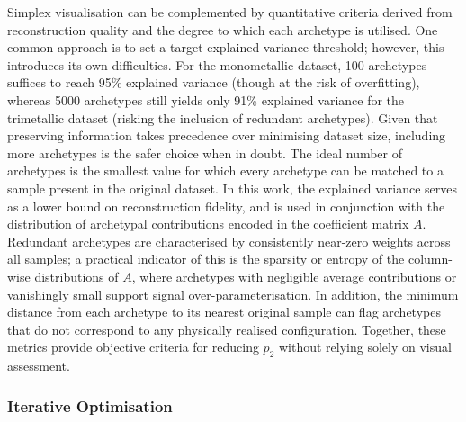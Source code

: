 \documentclass{WileyMSP-template}
\begin{document}
Simplex visualisation can be complemented by quantitative criteria derived from reconstruction quality and the degree to which each archetype is utilised. One common approach is to set a target explained variance threshold; however, this introduces its own difficulties. For the monometallic dataset, 100 archetypes suffices to reach 95\% explained variance (though at the risk of overfitting), whereas 5000 archetypes still yields only 91\% explained variance for the trimetallic dataset (risking the inclusion of redundant archetypes). Given that preserving information takes precedence over minimising dataset size, including more archetypes is the safer choice when in doubt. The ideal number of archetypes is the smallest value for which every archetype can be matched to a sample present in the original dataset. In this work, the explained variance serves as a lower bound on reconstruction fidelity, and is used in conjunction with the distribution of archetypal contributions encoded in the coefficient matrix $A$. Redundant archetypes are characterised by consistently near-zero weights across all samples; a practical indicator of this is the sparsity or entropy of the column-wise distributions of $A$, where archetypes with negligible average contributions or vanishingly small support signal over-parameterisation. In addition, the minimum distance from each archetype to its nearest original sample can flag archetypes that do not correspond to any physically realised configuration. Together, these metrics provide objective criteria for reducing $p_2$ without relying solely on visual assessment.

\subsubsection{Iterative Optimisation}
\label{sec:iterOptim}
\end{document}
